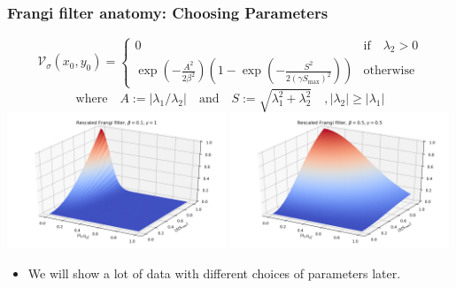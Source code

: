 \documentclass[9pt,notes]{beamer}
\newcommand{\Vsigma}{\ensuremath{\mathcal{V}_{\sigma}}\xspace}
\begin{document}
\begin{frame}
\frametitle[Frangi parameters]{Frangi filter anatomy: Choosing Parameters}
  \begin{equation}
  \Vsigma(x_0,y_0) =
  \begin{cases}
  0 & \text{if} \quad \lambda_2 > 0 \\
  \exp\left(-\frac{A^2}{2\beta^2}\right)
  \left(1 - \exp\left(-\frac{S^2}{2{(\gamma S_{\max})}^2}\right)\right) & \textrm{otherwise}
  \end{cases}
  \end{equation}
  \begin{equation}
  \textrm{where} \quad A := \left|\lambda_1 / \lambda_2\right|
  \quad \textrm{and} \quad 
  S := \sqrt{\lambda_1^2 + \lambda_2^2}
  \quad, \left|\lambda_2\right| \ge \left|\lambda_1\right|
  \end{equation}
\includegraphics[width=0.49\textwidth]{4} %
\includegraphics[width=0.49\textwidth]{14} %
\begin{itemize}
\item We will show a lot of data with different choices of parameters later.
\end{itemize}
\end{frame}
\end{document}
